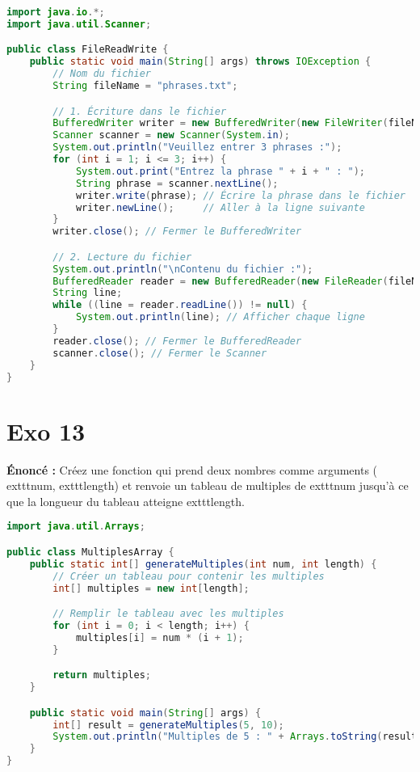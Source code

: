 \documentclass{article}
\begin{document}
\begin{lstlisting}[language=Java]
import java.io.*;
import java.util.Scanner;

public class FileReadWrite {
    public static void main(String[] args) throws IOException {
        // Nom du fichier
        String fileName = "phrases.txt";

        // 1. Écriture dans le fichier
        BufferedWriter writer = new BufferedWriter(new FileWriter(fileName));
        Scanner scanner = new Scanner(System.in);
        System.out.println("Veuillez entrer 3 phrases :");
        for (int i = 1; i <= 3; i++) {
            System.out.print("Entrez la phrase " + i + " : ");
            String phrase = scanner.nextLine();
            writer.write(phrase); // Écrire la phrase dans le fichier
            writer.newLine();     // Aller à la ligne suivante
        }
        writer.close(); // Fermer le BufferedWriter

        // 2. Lecture du fichier
        System.out.println("\nContenu du fichier :");
        BufferedReader reader = new BufferedReader(new FileReader(fileName));
        String line;
        while ((line = reader.readLine()) != null) {
            System.out.println(line); // Afficher chaque ligne
        }
        reader.close(); // Fermer le BufferedReader
        scanner.close(); // Fermer le Scanner
    }
}
\end{lstlisting}
\clearpage

\section*{Exo 13}
\noindent \textbf{Énoncé :} Créez une fonction qui prend deux nombres comme arguments (	exttt{num}, 	exttt{length}) et renvoie un tableau de multiples de 	exttt{num} jusqu'à ce que la longueur du tableau atteigne 	exttt{length}.

\begin{lstlisting}[language=Java]
import java.util.Arrays;

public class MultiplesArray {
    public static int[] generateMultiples(int num, int length) {
        // Créer un tableau pour contenir les multiples
        int[] multiples = new int[length];

        // Remplir le tableau avec les multiples
        for (int i = 0; i < length; i++) {
            multiples[i] = num * (i + 1);
        }

        return multiples;
    }

    public static void main(String[] args) {
        int[] result = generateMultiples(5, 10);
        System.out.println("Multiples de 5 : " + Arrays.toString(result));
    }
}
\end{lstlisting}
\clearpage
\end{document}
